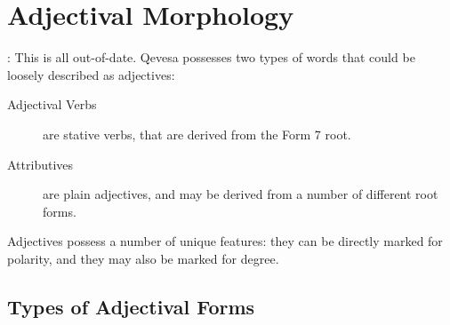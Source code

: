 \documentclass[grammar]{subfiles}
\begin{document}
  \chapter{Adjectival Morphology}
  \label{ch:adjectival-morphology}

  \ToBeWritten: This is all out-of-date.
  Qevesa possesses two types of words that could be loosely described as adjectives:

  \begin{description}
    \item[Adjectival Verbs] are stative verbs, that are derived from the Form 7 root.
    \item[Attributives] are plain adjectives, and may be derived from a number of different root forms.
  \end{description}

  Adjectives possess a number of unique features: they can be directly marked
  for polarity, and they may also be marked for degree.


  \section{Types of Adjectival Forms}
  \label{sec:am_adjectival_forms}
\end{document}
